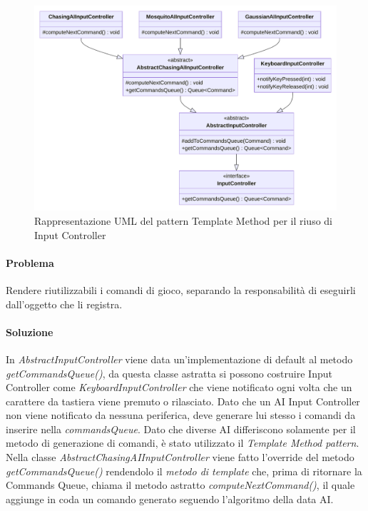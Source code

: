 \documentclass[a4paper,12pt]{report}
\begin{document}
\begin{figure}[H]
\centering{}
\includegraphics[scale=0.75]{img/InputControllerTemplateMethodUML}
\caption{Rappresentazione UML del pattern Template Method per il riuso di Input Controller}
\label{img:inputControllerTemplateMethod}
\end{figure}

\paragraph{Problema} Rendere riutilizzabili i comandi di gioco, separando la responsabilità di eseguirli dall’oggetto che li registra.

\paragraph{Soluzione} In \textit{AbstractInputController} viene data un’implementazione di default al metodo
\textit{getCommandsQueue()}, da questa classe astratta si possono costruire Input Controller 
come \textit{KeyboardInputController} che viene notificato ogni volta che un carattere da tastiera viene premuto
o rilasciato. Dato che un AI Input Controller non viene notificato da nessuna periferica, 
deve generare lui stesso i comandi da inserire nella \textit{commandsQueue}. 
Dato che diverse AI differiscono solamente per il metodo di generazione di comandi, è stato utilizzato il \textit{Template Method pattern}. 
\\
Nella classe \textit{AbstractChasingAIInputController} viene fatto l’override del metodo \textit{getCommandsQueue()} rendendolo il \textit{metodo di template} che, 
prima di ritornare la Commands Queue, chiama il metodo astratto \textit{computeNextCommand()}, 
il quale aggiunge in coda un comando generato seguendo l’algoritmo della data AI.
\end{document}
